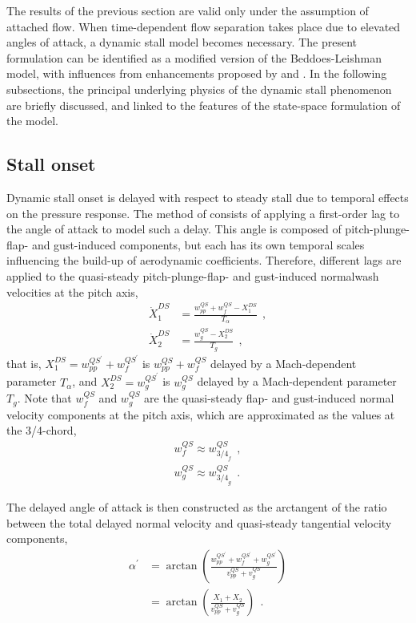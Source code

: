 \documentclass[12pt,a4paper,oneside,english]{abntex2} %
\def\lp{\left(}
\def\rp{\right)}
\def\alphalag{\alpha^\prime}
\begin{document}
The results of the previous section are valid only under the assumption of attached flow. When time-dependent flow separation takes place due to elevated angles of attack, a dynamic stall model becomes necessary. The present formulation can be identified as a modified version of the Beddoes-Leishman \cite{leishman1986generalised} model, with influences from enhancements proposed by  and . In the following subsections, the principal underlying physics of the dynamic stall phenomenon are briefly discussed, and linked to the features of the state-space formulation of the model.

\subsection{Stall onset}

Dynamic stall onset is delayed with respect to steady stall due to temporal effects on the pressure response. The method of  consists of applying a first-order lag to the angle of attack to model such a delay. This angle is composed of pitch-plunge-flap- and gust-induced components, but each has its own temporal scales influencing the build-up of aerodynamic coefficients. Therefore, different lags are applied to the quasi-steady pitch-plunge-flap- and gust-induced normalwash velocities at the pitch axis,
\begin{align}
    \dot{X}_{1}^{DS} &= \frac{w_{pp}^{QS}+w_f^{QS}-X_{1}^{DS}}{T_\alpha} \ \ ,
    \label{eq:w_pp_ds_state} 
    \\
    \dot{X}_{2}^{DS} &= \frac{w_g^{QS}-X_{2}^{DS}}{T_g} \ \ , \label{eq:w_g_ds_state} 
\end{align}
that is, $X_{1}^{DS}=w_{pp}^{QS^{\prime}}+w_f^{QS^{\prime}}$ is $w_{pp}^{QS}+w_f^{QS}$ delayed by a Mach-dependent parameter $T_{\alpha}$, and $X_{2}^{DS}=w_g^{QS^{\prime}}$ is $w_g^{QS}$ delayed by a Mach-dependent parameter $T_g$. Note that $w_f^{QS}$ and $w_g^{QS}$ are the quasi-steady flap- and gust-induced normal velocity components at the pitch axis, which are approximated as the values at the 3/4-chord,
\begin{align}
    w_f^{QS} \approx w_{{3/4}_f}^{QS} \ \ ,
    \label{eq:w_f_QS} 
    \\
    w_g^{QS} \approx w_{{3/4}_g}^{QS} \ \ .
    \label{eq:w_g_QS} 
\end{align}

The delayed angle of attack is then constructed as the arctangent of the ratio between the total delayed normal velocity and quasi-steady tangential velocity components, 
\begin{align}
    \alphalag &= \arctan\lp\frac{w_{pp}^{QS^{\prime}}+w_f^{QS^{\prime}}+w_g^{QS^{\prime}}}{v_{pp}^{QS}+v_g^{QS}}\rp
    \nonumber
    \\
    &= \arctan\lp\frac{X_1+X_2}{v_{pp}^{QS}+v_g^{QS}}\rp \ \ .
    \label{eq:alphalag} 
\end{align}
\end{document}
